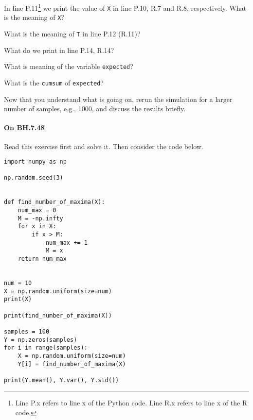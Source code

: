 \documentclass[assignments]{subfiles}
\begin{document}
\begin{exercise}
In line P.11\footnote{Line P.x refers to line x of the Python code.
  Line R.x refers to line x of the R code.}
we print the value of \texttt{X} in line P.10, R.7 and R.8, respectively.
What is the meaning of \texttt{X}?
\begin{solution}
\end{solution}
\end{exercise}

\begin{exercise}
What is the meaning of \texttt{T} in line P.12 (R.11)?
\begin{solution}
\end{solution}
\end{exercise}


\begin{exercise}
What do we print in line P.14, R.14?
\begin{solution}
\end{solution}
\end{exercise}

\begin{exercise}
What is meaning of the variable \texttt{expected}?
\begin{solution}
\end{solution}
\end{exercise}

\begin{exercise}
 What is the \texttt{cumsum} of \texttt{expected}?
\begin{solution}
\end{solution}
\end{exercise}

\begin{exercise}
 Now that you understand what is going on, rerun the simulation for a larger number of samples, e.g., 1000, and discuss the results briefly.
\begin{solution}
\end{solution}
\end{exercise}

\paragraph{On   BH.7.48} Read this exercise first and solve it. Then consider the code below.

\begin{verbatim}
import numpy as np

np.random.seed(3)


def find_number_of_maxima(X):
    num_max = 0
    M = -np.infty
    for x in X:
        if x > M:
            num_max += 1
            M = x
    return num_max


num = 10
X = np.random.uniform(size=num)
print(X)

print(find_number_of_maxima(X))

samples = 100
Y = np.zeros(samples)
for i in range(samples):
    X = np.random.uniform(size=num)
    Y[i] = find_number_of_maxima(X)

print(Y.mean(), Y.var(), Y.std())
\end{verbatim}
\end{document}
